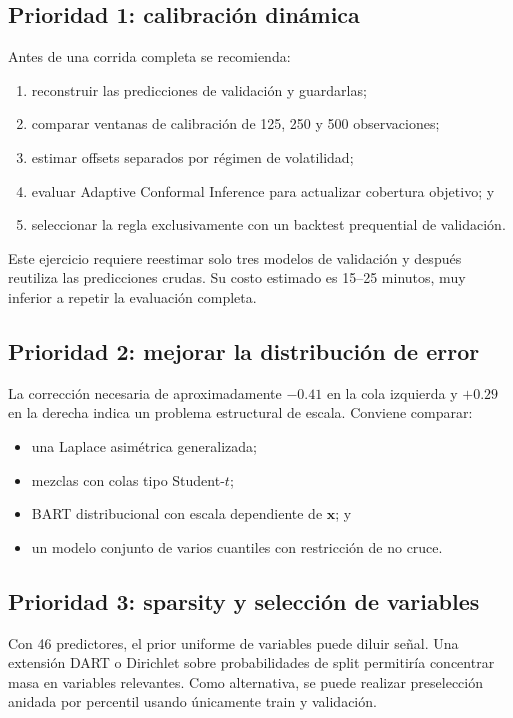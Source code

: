 \documentclass[11pt,a4paper]{article}
\begin{document}
\subsection{Prioridad 1: calibración dinámica}

Antes de una corrida completa se recomienda:

\begin{enumerate}[leftmargin=*]
  \item reconstruir las predicciones de validación y guardarlas;
  \item comparar ventanas de calibración de 125, 250 y 500 observaciones;
  \item estimar offsets separados por régimen de volatilidad;
  \item evaluar Adaptive Conformal Inference para actualizar cobertura
  objetivo; y
  \item seleccionar la regla exclusivamente con un backtest prequential de
  validación.
\end{enumerate}

Este ejercicio requiere reestimar solo tres modelos de validación y después
reutiliza las predicciones crudas. Su costo estimado es 15--25 minutos, muy
inferior a repetir la evaluación completa.

\subsection{Prioridad 2: mejorar la distribución de error}

La corrección necesaria de aproximadamente \(-0.41\) en la cola izquierda y
\(+0.29\) en la derecha indica un problema estructural de escala. Conviene
comparar:

\begin{itemize}[leftmargin=*]
  \item una Laplace asimétrica generalizada;
  \item mezclas con colas tipo Student-\(t\);
  \item BART distribucional con escala dependiente de \(\bm x\); y
  \item un modelo conjunto de varios cuantiles con restricción de no cruce.
\end{itemize}

\subsection{Prioridad 3: sparsity y selección de variables}

Con 46 predictores, el prior uniforme de variables puede diluir señal. Una
extensión DART o Dirichlet sobre probabilidades de split permitiría
concentrar masa en variables relevantes. Como alternativa, se puede realizar
preselección anidada por percentil usando únicamente train y validación.
\end{document}
